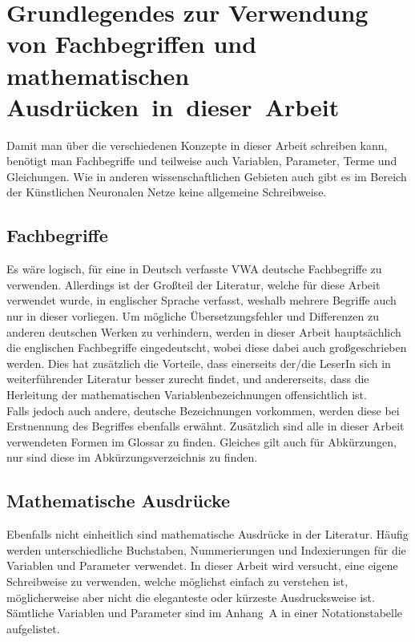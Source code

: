 \documentclass[a4paper,12pt,ngerman,oneside]{scrreprt}	%
\begin{document}
		\section{Grundlegendes zur Verwendung von Fachbegriffen und mathematischen \mbox{Ausdrücken in dieser Arbeit}}\label{Fachbegriffe&Mathe}
		Damit man über die verschiedenen Konzepte in dieser Arbeit schreiben kann, benötigt man Fachbegriffe und teilweise auch Variablen, Parameter, Terme und Gleichungen. Wie in anderen wissenschaftlichen Gebieten auch gibt es im Bereich der Künstlichen Neuronalen Netze keine allgemeine Schreibweise. 
			\subsection{Fachbegriffe}\label{Fachbegriffe}
			Es wäre logisch, für eine in Deutsch verfasste VWA deutsche Fachbegriffe zu verwenden. Allerdings ist der Großteil der Literatur, welche für diese Arbeit verwendet wurde, in englischer Sprache verfasst, weshalb mehrere Begriffe auch nur in dieser vorliegen. Um mögliche Übersetzungsfehler und Differenzen zu anderen deutschen Werken zu verhindern, werden in dieser Arbeit hauptsächlich die englischen Fachbegriffe eingedeutscht, wobei diese dabei auch großgeschrieben werden. Dies hat zusätzlich die Vorteile, dass einerseits der/die LeserIn sich in weiterführender Literatur besser zurecht findet, und andererseits, dass die Herleitung der mathematischen Variablenbezeichnungen offensichtlich ist. \newline\\ Falls jedoch auch andere, deutsche Bezeichnungen vorkommen, werden diese bei Erstnennung des Begriffes ebenfalls erwähnt. Zusätzlich sind alle in dieser Arbeit verwendeten Formen im Glossar zu finden. Gleiches gilt auch für Abkürzungen, nur sind diese im Abkürzungsverzeichnis zu finden. 
			
			\subsection{Mathematische Ausdrücke}\label{Mathe}
			Ebenfalls nicht einheitlich sind mathematische Ausdrücke in der Literatur. Häufig werden unterschiedliche Buchstaben, Nummerierungen und Indexierungen für die Variablen und Parameter verwendet. In dieser Arbeit wird versucht, eine eigene Schreibweise zu verwenden, welche möglichst einfach zu verstehen ist, möglicherweise aber nicht die eleganteste oder kürzeste Ausdrucksweise ist. Sämtliche Variablen und Parameter sind im \mbox{Anhang A} in einer Notationstabelle aufgelistet. 
			
\end{document}
